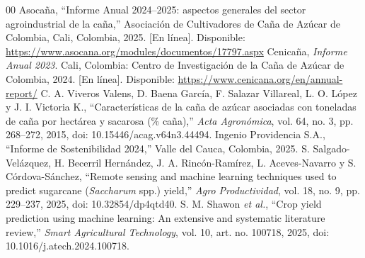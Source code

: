 \documentclass[conference]{IEEEtran}
\begin{document}
\begin{thebibliography}{00}
 Asocaña, ``Informe Anual 2024--2025: aspectos generales del sector agroindustrial de la caña,'' Asociación de Cultivadores de Caña de Azúcar de Colombia, Cali, Colombia, 2025. [En línea]. Disponible: \url{https://www.asocana.org/modules/documentos/17797.aspx}
 Cenicaña, \textit{Informe Anual 2023}. Cali, Colombia: Centro de Investigación de la Caña de Azúcar de Colombia, 2024. [En línea]. Disponible: \url{https://www.cenicana.org/en/annual-report/}
 C. A. Viveros Valens, D. Baena García, F. Salazar Villareal, L. O. López y J. I. Victoria K., ``Características de la caña de azúcar asociadas con toneladas de caña por hectárea y sacarosa (\% caña),'' \textit{Acta Agronómica}, vol. 64, no. 3, pp. 268--272, 2015, doi: 10.15446/acag.v64n3.44494.
 Ingenio Providencia S.A., ``Informe de Sostenibilidad 2024,'' Valle del Cauca, Colombia, 2025.
 S. Salgado-Velázquez, H. Becerril Hernández, J. A. Rincón-Ramírez, L. Aceves-Navarro y S. Córdova-Sánchez, ``Remote sensing and machine learning techniques used to predict sugarcane (\textit{Saccharum} spp.) yield,'' \textit{Agro Productividad}, vol. 18, no. 9, pp. 229--237, 2025, doi: 10.32854/dp4qtd40.
 S. M. Shawon \textit{et al.}, ``Crop yield prediction using machine learning: An extensive and systematic literature review,'' \textit{Smart Agricultural Technology}, vol. 10, art. no. 100718, 2025, doi: 10.1016/j.atech.2024.100718.
\end{thebibliography}
\end{document}
